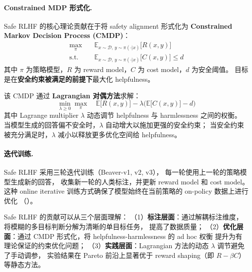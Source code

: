 \paragraph{Constrained MDP 形式化.}
Safe RLHF 的核心理论贡献在于将 safety alignment 形式化为
\textbf{Constrained Markov Decision Process (CMDP)}：
\begin{align}
  \max_\pi \quad & \mathbb{E}_{x \sim \mathcal{D},\, y \sim \pi(\cdot|x)} \big[ R(x, y) \big]
  \label{eq:saferlhf-obj} \\
  \text{s.t.} \quad & \mathbb{E}_{x \sim \mathcal{D},\, y \sim \pi(\cdot|x)} \big[ C(x, y) \big] \leq d
  \label{eq:saferlhf-constraint}
\end{align}
其中 $\pi$ 为策略模型，$R$ 为 reward model，$C$ 为 cost model，$d$ 为安全阈值。
目标是在\textbf{安全约束被满足的前提下}最大化 helpfulness。

该 CMDP 通过 \textbf{Lagrangian 对偶方法}求解：
\begin{equation}
  \min_{\lambda \geq 0} \max_\pi \quad
  \mathbb{E}\big[ R(x,y) \big] - \lambda \big( \mathbb{E}\big[ C(x,y) \big] - d \big)
  \label{eq:saferlhf-lagrangian}
\end{equation}
其中 Lagrange multiplier $\lambda$ 动态调节 helpfulness 与 harmlessness 之间的权衡。
当模型生成的回答偏不安全时，$\lambda$ 自动增大以施加更强的安全约束；
当安全约束被充分满足时，$\lambda$ 减小以释放更多优化空间给 helpfulness。

\paragraph{迭代训练.}
Safe RLHF 采用三轮迭代训练（Beaver-v1, v2, v3），
每一轮使用上一轮的策略模型生成新的回答，
收集新一轮的人类标注，并更新 reward model 和 cost model。
这种 online iterative 训练方式确保了模型始终在当前策略的 on-policy 数据上进行优化
（）。

\begin{solutionbox}
Safe RLHF 的贡献可以从三个层面理解：
（1）\textbf{标注层面}：通过解耦标注维度，将模糊的多目标判断分解为清晰的单目标任务，
提高了数据质量；
（2）\textbf{优化层面}：通过 CMDP 形式化，将 helpfulness-harmlessness 的 ad hoc 权衡
提升为有理论保证的约束优化问题；
（3）\textbf{实践层面}：Lagrangian 方法的动态 $\lambda$ 调节避免了手动调参，
实验结果在 Pareto 前沿上显著优于 reward shaping（即 $R - \beta C$）等静态方法。
\end{solutionbox}


